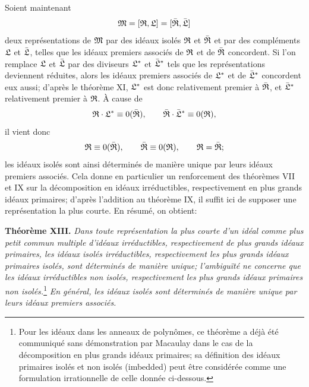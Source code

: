 Soient maintenant
\[
 \mathfrak{M}=[\mathfrak{R},\mathfrak{L}]=[\bar{\mathfrak{R}},\bar{\mathfrak{L}}]
\]
deux représentations de $\mathfrak{M}$ par des idéaux isolés $\mathfrak{R}$ et $\bar{\mathfrak{R}}$ et par des compléments $\mathfrak{L}$ et $\bar{\mathfrak{L}}$, telles que les idéaux premiers associés de $\mathfrak{R}$ et de $\bar{\mathfrak{R}}$ concordent. Si l'on remplace $\mathfrak{L}$ et $\bar{\mathfrak{L}}$ par des diviseurs $\mathfrak{L}^*$ et $\bar{\mathfrak{L}}^{*}$ tels que les représentations deviennent réduites, alors les idéaux premiers associés de $\mathfrak{L}^*$ et de $\bar{\mathfrak{L}}^{*}$ concordent eux aussi; d'après le théorème XI, $\mathfrak{L}^*$ est donc relativement premier à $\bar{\mathfrak{R}}$, et $\bar{\mathfrak{L}}^{*}$ relativement premier à $\mathfrak{R}$. À cause de
\[
 \mathfrak{R}\cdot\mathfrak{L}^*\equiv0(\bar{\mathfrak{R}}),
 \qquad
 \bar{\mathfrak{R}}\cdot\bar{\mathfrak{L}}^{*}\equiv0(\mathfrak{R}),
\]
il vient donc
\[
 \mathfrak{R}\equiv0(\bar{\mathfrak{R}}),
 \qquad
 \bar{\mathfrak{R}}\equiv0(\mathfrak{R}),
 \qquad
 \mathfrak{R}=\bar{\mathfrak{R}};
\]
les idéaux isolés sont ainsi déterminés de manière unique par leurs idéaux premiers associés. Cela donne en particulier un renforcement des théorèmes VII et IX sur la décomposition en idéaux irréductibles, respectivement en plus grands idéaux primaires; d'après l'addition au théorème IX, il suffit ici de supposer une représentation la plus courte. En résumé, on obtient:

\textbf{Théorème XIII.} \emph{Dans toute représentation la plus courte d'un idéal comme plus petit commun multiple d'idéaux irréductibles, respectivement de plus grands idéaux primaires, les idéaux isolés irréductibles, respectivement les plus grands idéaux primaires isolés, sont déterminés de manière unique; l'ambiguïté ne concerne que les idéaux irréductibles non isolés, respectivement les plus grands idéaux primaires non isolés.}\footnote{Pour les idéaux dans les anneaux de polynômes, ce théorème a déjà été communiqué sans démonstration par Macaulay dans le cas de la décomposition en plus grands idéaux primaires; sa définition des idéaux primaires isolés et non isolés (imbedded) peut être considérée comme une formulation irrationnelle de celle donnée ci-dessous.} \emph{En général, les idéaux isolés sont déterminés de manière unique par leurs idéaux premiers associés.}

